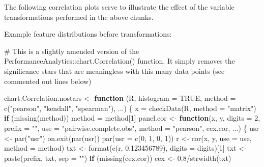 \documentclass[
  letterpaper,
  DIV=11,
  numbers=noendperiod]{scrreprt}
\newenvironment{Shaded}{\begin{snugshade}}{\end{snugshade}}
\newcommand{\AttributeTok}[1]{\textcolor[rgb]{0.40,0.45,0.13}{#1}}
\newcommand{\CommentTok}[1]{\textcolor[rgb]{0.37,0.37,0.37}{#1}}
\newcommand{\ConstantTok}[1]{\textcolor[rgb]{0.56,0.35,0.01}{#1}}
\newcommand{\ControlFlowTok}[1]{\textcolor[rgb]{0.00,0.23,0.31}{\textbf{#1}}}
\newcommand{\DecValTok}[1]{\textcolor[rgb]{0.68,0.00,0.00}{#1}}
\newcommand{\FloatTok}[1]{\textcolor[rgb]{0.68,0.00,0.00}{#1}}
\newcommand{\FunctionTok}[1]{\textcolor[rgb]{0.28,0.35,0.67}{#1}}
\newcommand{\NormalTok}[1]{\textcolor[rgb]{0.00,0.23,0.31}{#1}}
\newcommand{\OtherTok}[1]{\textcolor[rgb]{0.00,0.23,0.31}{#1}}
\newcommand{\SpecialCharTok}[1]{\textcolor[rgb]{0.37,0.37,0.37}{#1}}
\newcommand{\StringTok}[1]{\textcolor[rgb]{0.13,0.47,0.30}{#1}}
\begin{document}
The following correlation plots serve to illustrate the effect of the
variable transformations performed in the above chunks.

Example feature distributions before transformations:

\begin{Shaded}
\begin{Highlighting}[]
\CommentTok{\# This is a slightly amended version of the PerformanceAnalytics::chart.Correlation() function. It simply removes the significance stars that are meaningless with this many data points (see commented out lines below)}

\NormalTok{chart.Correlation.nostars }\OtherTok{\textless{}{-}} \ControlFlowTok{function}\NormalTok{ (R, }\AttributeTok{histogram =} \ConstantTok{TRUE}\NormalTok{, }\AttributeTok{method =} \FunctionTok{c}\NormalTok{(}\StringTok{"pearson"}\NormalTok{, }\StringTok{"kendall"}\NormalTok{, }\StringTok{"spearman"}\NormalTok{), ...) \{}
\NormalTok{  x }\OtherTok{=} \FunctionTok{checkData}\NormalTok{(R, }\AttributeTok{method =} \StringTok{"matrix"}\NormalTok{)}
  \ControlFlowTok{if}\NormalTok{ (}\FunctionTok{missing}\NormalTok{(method)) }
\NormalTok{    method }\OtherTok{=}\NormalTok{ method[}\DecValTok{1}\NormalTok{]}
\NormalTok{  panel.cor }\OtherTok{\textless{}{-}} \ControlFlowTok{function}\NormalTok{(x, y, }\AttributeTok{digits =} \DecValTok{2}\NormalTok{, }\AttributeTok{prefix =} \StringTok{""}\NormalTok{, }\AttributeTok{use =} \StringTok{"pairwise.complete.obs"}\NormalTok{, }\AttributeTok{method =} \StringTok{"pearson"}\NormalTok{, cex.cor, ...) \{}
\NormalTok{    usr }\OtherTok{\textless{}{-}} \FunctionTok{par}\NormalTok{(}\StringTok{"usr"}\NormalTok{)}
    \FunctionTok{on.exit}\NormalTok{(}\FunctionTok{par}\NormalTok{(usr))}
    \FunctionTok{par}\NormalTok{(}\AttributeTok{usr =} \FunctionTok{c}\NormalTok{(}\DecValTok{0}\NormalTok{, }\DecValTok{1}\NormalTok{, }\DecValTok{0}\NormalTok{, }\DecValTok{1}\NormalTok{))}
\NormalTok{    r }\OtherTok{\textless{}{-}} \FunctionTok{cor}\NormalTok{(x, y, }\AttributeTok{use =}\NormalTok{ use, }\AttributeTok{method =}\NormalTok{ method)}
\NormalTok{    txt }\OtherTok{\textless{}{-}} \FunctionTok{format}\NormalTok{(}\FunctionTok{c}\NormalTok{(r, }\FloatTok{0.123456789}\NormalTok{), }\AttributeTok{digits =}\NormalTok{ digits)[}\DecValTok{1}\NormalTok{]}
\NormalTok{    txt }\OtherTok{\textless{}{-}} \FunctionTok{paste}\NormalTok{(prefix, txt, }\AttributeTok{sep =} \StringTok{""}\NormalTok{)}
    \ControlFlowTok{if}\NormalTok{ (}\FunctionTok{missing}\NormalTok{(cex.cor)) }
\NormalTok{      cex }\OtherTok{\textless{}{-}} \FloatTok{0.8}\SpecialCharTok{/}\FunctionTok{strwidth}\NormalTok{(txt)}

\end{Highlighting}
\end{Shaded}
\end{document}
